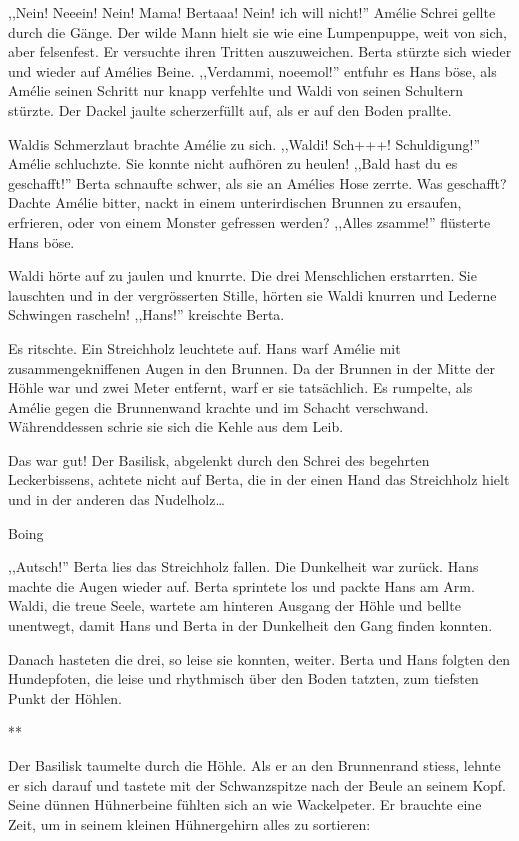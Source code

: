 \documentclass[11pt,titlepage,a5paper]{book}
\newcommand{\sterne}{\par{\centering ***\par}}
\newcommand{\am}{Amélie }
\begin{document}
,,Nein! Neeein! Nein! Mama! Bertaaa! Nein! ich will nicht!'' \am Schrei gellte durch die Gänge. Der wilde Mann hielt sie wie eine Lumpenpuppe, weit von sich, aber felsenfest. Er versuchte ihren Tritten auszuweichen. Berta stürzte sich wieder und wieder auf Amélies Beine. ,,Verdammi, noeemol!'' entfuhr es Hans böse, als \am seinen Schritt nur knapp verfehlte und Waldi von seinen Schultern stürzte. Der Dackel jaulte scherzerfüllt auf, als er auf den Boden prallte.

Waldis Schmerzlaut brachte \am zu sich. ,,Waldi! Sch+++! Schuldigung!'' \am schluchzte. Sie konnte nicht aufhören zu heulen! ,,Bald hast du es geschafft!'' Berta schnaufte schwer, als sie an Amélies Hose zerrte. Was geschafft? Dachte \am bitter, nackt in einem unterirdischen Brunnen zu ersaufen, erfrieren, oder von einem Monster gefressen werden? ,,Alles zsamme!'' flüsterte Hans böse.

Waldi hörte auf zu jaulen und knurrte. Die drei Menschlichen erstarrten. Sie lauschten und in der vergrösserten Stille, hörten sie Waldi knurren und Lederne Schwingen rascheln! ,,Hans!'' kreischte Berta.

Es ritschte. Ein Streichholz leuchtete auf. Hans warf \am mit zusammengekniffenen Augen in den Brunnen. Da der Brunnen in der Mitte der Höhle war und zwei Meter entfernt, warf er sie tatsächlich. Es rumpelte, als \am gegen die Brunnenwand krachte und im Schacht verschwand. Währenddessen schrie sie sich die Kehle aus dem Leib.

Das war gut! Der Basilisk, abgelenkt durch den Schrei des begehrten Leckerbissens, achtete nicht auf Berta, die in der einen Hand das Streichholz hielt und in der anderen das Nudelholz\dots

\begin{LARGE}
Boing
\end{LARGE}

,,Autsch!'' Berta lies das Streichholz fallen. Die Dunkelheit war zurück. Hans machte die Augen wieder auf. Berta sprintete los und packte Hans am Arm. Waldi, die treue Seele, wartete am hinteren Ausgang der Höhle und bellte unentwegt, damit Hans und Berta in der Dunkelheit den Gang finden konnten. 

Danach hasteten die drei, so leise sie konnten, weiter. Berta und Hans folgten den Hundepfoten, die leise und rhythmisch über den Boden tatzten, zum tiefsten Punkt der Höhlen.

\sterne

Der Basilisk taumelte durch die Höhle. Als er an den Brunnenrand stiess, lehnte er sich darauf und tastete mit der Schwanzspitze nach der Beule an seinem Kopf. Seine dünnen Hühnerbeine fühlten sich an wie Wackelpeter. Er brauchte eine Zeit, um in seinem kleinen Hühnergehirn alles zu sortieren: 
\end{document}
